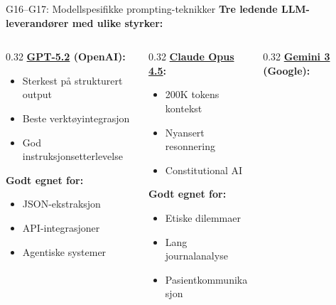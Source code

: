\documentclass[aspectratio=169, 10pt]{beamer}
\begin{document}
\begin{frame}{G16--G17: Modellspesifikke prompting-teknikker}
    \textbf{Tre ledende LLM-leverandører med ulike styrker:}
    
    \vspace{0.2cm}
    \begin{columns}[T]
        \begin{column}{0.32\textwidth}
            \textbf{\href{https://openai.com/gpt-5}{GPT-5.2} (OpenAI):}
            \footnotesize
            \begin{itemize}
                \item Sterkest på strukturert output
                \item Beste verktøyintegrasjon
                \item God instruksjonsetterlevelse
            \end{itemize}
            \textbf{Godt egnet for:}
            \begin{itemize}
                \item JSON-ekstraksjon
                \item API-integrasjoner
                \item Agentiske systemer
            \end{itemize}
        \end{column}
        \begin{column}{0.32\textwidth}
            \textbf{\href{https://anthropic.com/claude}{Claude Opus 4.5}:}
            \footnotesize
            \begin{itemize}
                \item 200K tokens kontekst
                \item Nyansert resonnering
                \item Constitutional AI
            \end{itemize}
            \textbf{Godt egnet for:}
            \begin{itemize}
                \item Etiske dilemmaer
                \item Lang journalanalyse
                \item Pasientkommunikasjon
            \end{itemize}
        \end{column}
        \begin{column}{0.32\textwidth}
            \textbf{\href{https://deepmind.google/gemini}{Gemini 3} (Google):}
            \footnotesize

\end{column}
\end{columns}
\end{frame}
\end{document}
